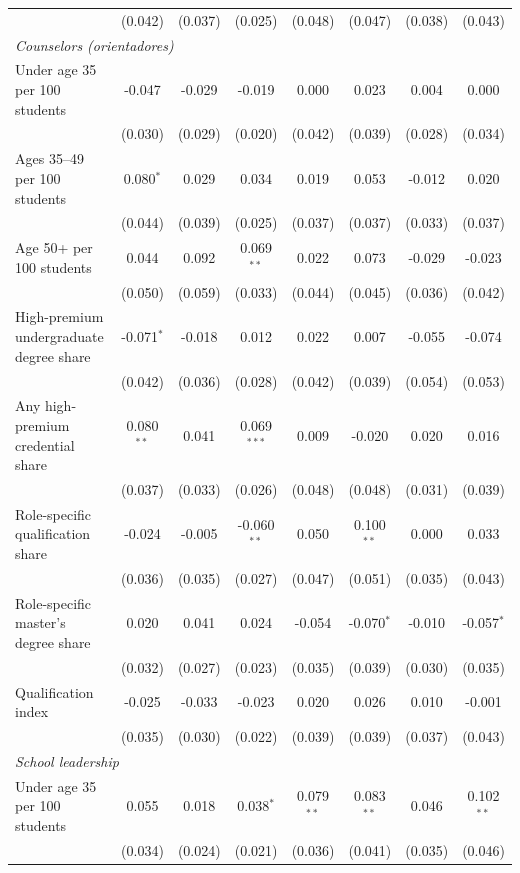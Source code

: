 \begin{table}[!htbp]
{\begin{tabular}{lccccccc}
 & (0.042) & (0.037) & (0.025) & (0.048) & (0.047) & (0.038) & (0.043) \\
\multicolumn{8}{l}{\textit{Counselors (orientadores)}} \\
\quad Under age 35 per 100 students & -0.047 & -0.029 & -0.019 & 0.000 & 0.023 & 0.004 & 0.000 \\
 & (0.030) & (0.029) & (0.020) & (0.042) & (0.039) & (0.028) & (0.034) \\
\quad Ages 35--49 per 100 students & 0.080$^{*}$ & 0.029 & 0.034 & 0.019 & 0.053 & -0.012 & 0.020 \\
 & (0.044) & (0.039) & (0.025) & (0.037) & (0.037) & (0.033) & (0.037) \\
\quad Age 50+ per 100 students & 0.044 & 0.092 & 0.069$^{**}$ & 0.022 & 0.073 & -0.029 & -0.023 \\
 & (0.050) & (0.059) & (0.033) & (0.044) & (0.045) & (0.036) & (0.042) \\
\quad High-premium undergraduate degree share & -0.071$^{*}$ & -0.018 & 0.012 & 0.022 & 0.007 & -0.055 & -0.074 \\
 & (0.042) & (0.036) & (0.028) & (0.042) & (0.039) & (0.054) & (0.053) \\
\quad Any high-premium credential share & 0.080$^{**}$ & 0.041 & 0.069$^{***}$ & 0.009 & -0.020 & 0.020 & 0.016 \\
 & (0.037) & (0.033) & (0.026) & (0.048) & (0.048) & (0.031) & (0.039) \\
\quad Role-specific qualification share & -0.024 & -0.005 & -0.060$^{**}$ & 0.050 & 0.100$^{**}$ & 0.000 & 0.033 \\
 & (0.036) & (0.035) & (0.027) & (0.047) & (0.051) & (0.035) & (0.043) \\
\quad Role-specific master's degree share & 0.020 & 0.041 & 0.024 & -0.054 & -0.070$^{*}$ & -0.010 & -0.057$^{*}$ \\
 & (0.032) & (0.027) & (0.023) & (0.035) & (0.039) & (0.030) & (0.035) \\
\quad Qualification index & -0.025 & -0.033 & -0.023 & 0.020 & 0.026 & 0.010 & -0.001 \\
 & (0.035) & (0.030) & (0.022) & (0.039) & (0.039) & (0.037) & (0.043) \\
\multicolumn{8}{l}{\textit{School leadership}} \\
\quad Under age 35 per 100 students & 0.055 & 0.018 & 0.038$^{*}$ & 0.079$^{**}$ & 0.083$^{**}$ & 0.046 & 0.102$^{**}$ \\
 & (0.034) & (0.024) & (0.021) & (0.036) & (0.041) & (0.035) & (0.046) \\

\end{tabular}}
\end{table}

